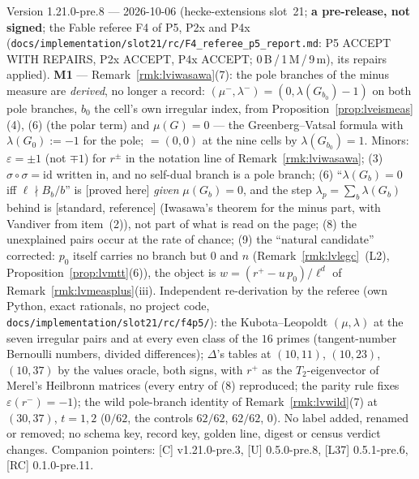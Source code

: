 \documentclass[11pt]{article}
\theoremstyle{remark}
\newcommand{\PROVED}{\textsf{[proved here]}}
\newcommand{\STD}{\textsf{[standard, reference]}}
\begin{document}
Version 1.21.0-pre.8 --- 2026-10-06 (hecke-extensions slot~21; \textbf{a pre-release, not signed}; the Fable referee F4 of P5, P2x and P4x
(\texttt{docs/implementation/slot21/rc/F4\_referee\_p5\_report.md}: P5 ACCEPT WITH REPAIRS, P2x ACCEPT, P4x ACCEPT; 0\,B\,/\,1\,M\,/\,9\,m), its repairs applied).
\textbf{M1} --- Remark~\ref{rmk:lviwasawa}(7): the pole branches of the minus measure are \emph{derived}, no longer a record: $(\mu^{-},\lambda^{-})=(0,\lambda(G_{b_0})-1)$ on both pole branches,
$b_0$ the cell's own irregular index, from Proposition~\ref{prop:lveismeas}(4), (6) (the polar term) and $\mu(G)=0$ --- the Greenberg--Vatsal formula with $\lambda(G_0):=-1$ for the pole;
$=(0,0)$ at the nine cells by $\lambda(G_{b_0})=1$. Minors: $\varepsilon=\pm1$ (not $\mp1$) for $r^{\pm}$ in the notation line of Remark~\ref{rmk:lviwasawa}; (3) $\sigma\circ\sigma=\mathrm{id}$ written in, and no self-dual
branch is a pole branch; (6) ``$\lambda(G_b)=0$ iff $\ell\nmid B_b/b$'' is \PROVED{} \emph{given} $\mu(G_b)=0$, and the step $\lambda_p=\sum_b\lambda(G_b)$ behind \cite{hho} is \STD{} (Iwasawa's theorem for the
minus part, with Vandiver from \cite{hho} item~(2)), not part of what is read on the page; (8) the unexplained pairs occur at the rate of chance; (9) the ``natural candidate'' corrected: $p_0$ itself carries no branch
but $0$ and $n$ (Remark~\ref{rmk:lvlegc}~(L2), Proposition~\ref{prop:lvmtt}(6)), the object is $w=(r^{+}-u\,p_0)/\ell^{d}$ of Remark~\ref{rmk:lvmeasplus}(iii). Independent re-derivation by the
referee (own Python, exact rationals, no project code, \texttt{docs/implementation/slot21/rc/f4p5/}): the Kubota--Leopoldt $(\mu,\lambda)$ at the seven irregular pairs and at every even class of the $16$ primes
(tangent-number Bernoulli numbers, divided differences); $\Delta$'s tables at $(10,11)$, $(10,23)$, $(10,37)$ by the values oracle, both signs, with $r^{+}$ as the $T_2$-eigenvector of Merel's Heilbronn matrices
(every entry of (8) reproduced; the parity rule fixes $\varepsilon(r^{-})=-1$); the wild pole-branch identity of Remark~\ref{rmk:lvwild}(7) at $(30,37)$, $t=1,2$ ($0/62$, the controls $62/62$, $62/62$, $0$).
No label added, renamed or removed; no schema key, record key, golden line, digest or census verdict changes. Companion pointers: [C] v1.21.0-pre.3, [U] 0.5.0-pre.8, [L37] 0.5.1-pre.6, [RC] 0.1.0-pre.11.
\end{document}
